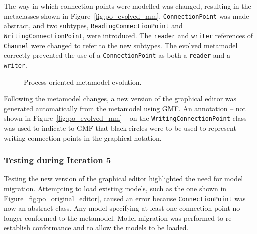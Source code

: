 The way in which connection points were modelled was changed, resulting in the metaclasses shown in Figure~\ref{fig:po_evolved_mm}. \texttt{Co\-nn\-ec\-ti\-o\-nPo\-i\-nt} was made abstract, and two subtypes, \texttt{Re\-ad\-i\-ngCo\-nn\-ec\-ti\-o\-nPo\-i\-nt} and \texttt{Wr\-i\-ti\-ngCo\-nn\-ec\-ti\-o\-nPo\-i\-nt}, were introduced. The \texttt{re\-ad\-er} and \texttt{wr\-it\-er} references of \texttt{Ch\-an\-n\-el} were changed to refer to the new subtypes. The evolved metamodel correctly prevented the use of a \texttt{Co\-nn\-ec\-ti\-o\-nPo\-i\-nt} as both a \texttt{re\-ad\-er} and a \texttt{wr\-it\-er}.

\begin{figure}[htbp]
	\centering
	\caption{Process-oriented metamodel evolution.}
\label{fig:po_mms}
\end{figure}

Following the metamodel changes, a new version of the graphical editor was generated automatically from the metamodel using GMF. An annotation -- not shown in Figure~\ref{fig:po_evolved_mm} -- on the \texttt{Wr\-i\-ti\-ngCo\-nn\-ec\-ti\-o\-nPo\-i\-nt} class was used to indicate to GMF that black circles were to be used to represent writing connection points in the graphical notation.

\subsubsection{Testing during Iteration 5}
Testing the new version of the graphical editor highlighted the need for model migration. Attempting to load existing models, such as the one shown in Figure~\ref{fig:po_original_editor}, caused an error because \texttt{Co\-nn\-ec\-ti\-onP\-oi\-nt} was now an abstract class. Any model specifying at least one connection point no longer conformed to the metamodel. Model migration was performed to re-establish conformance and to allow the models to be loaded. 

